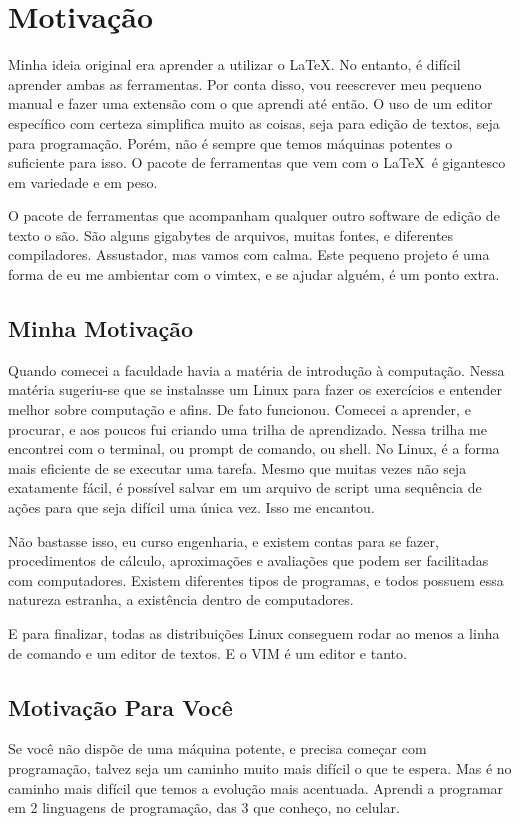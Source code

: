 \section{Motivação}
Minha ideia original era aprender a utilizar o \LaTeX.
No entanto, é difícil aprender ambas as ferramentas.
Por conta disso, vou reescrever meu pequeno manual e fazer uma extensão com o que aprendi até então.
O uso de um editor específico com certeza simplifica muito as coisas, seja para edição de textos, seja para programação.
Porém, não é sempre que temos máquinas potentes o suficiente para isso.
O pacote de ferramentas que vem com o \LaTeX\ é gigantesco em variedade e em peso.

O pacote de ferramentas que acompanham qualquer outro software de edição de texto o são.
São alguns gigabytes de arquivos, muitas fontes, e diferentes compiladores.
Assustador, mas vamos com calma.
Este pequeno projeto é uma forma de eu me ambientar com o vimtex, e se ajudar alguém, é um ponto extra.

\subsection{Minha Motivação}
Quando comecei a faculdade havia a matéria de introdução à computação.
Nessa matéria sugeriu-se que se instalasse um Linux para fazer os exercícios e entender melhor sobre computação e afins.
De fato funcionou.
Comecei a aprender, e procurar, e aos poucos fui criando uma trilha de aprendizado.
Nessa trilha me encontrei com o terminal, ou prompt de comando, ou shell.
No Linux, é a forma mais eficiente de se executar uma tarefa.
Mesmo que muitas vezes não seja exatamente fácil, é possível salvar em um arquivo de script uma sequência de ações para que seja difícil uma única vez.
Isso me encantou.

Não bastasse isso, eu curso engenharia, e existem contas para se fazer,
procedimentos de cálculo, aproximações e avaliações que podem ser facilitadas com computadores.
Existem diferentes tipos de programas, e todos possuem essa natureza estranha, a existência dentro de computadores.

E para finalizar, todas as distribuições Linux conseguem rodar ao menos a linha de comando e um editor de textos.
E o VIM é um editor e tanto.

\subsection{Motivação Para Você}
Se você não dispõe de uma máquina potente, e precisa começar com programação, talvez seja um caminho muito mais difícil o que te espera.
Mas é no caminho mais difícil que temos a evolução mais acentuada.
Aprendi a programar em 2 linguagens de programação, das 3 que conheço, no celular.

